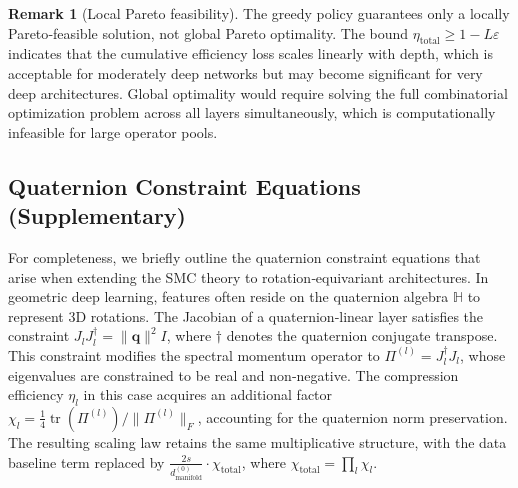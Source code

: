 \documentclass[11pt, a4paper]{article}
\theoremstyle{definition}
\newtheorem{remark}{Remark}[section]
\begin{document}
\begin{remark}[Local Pareto feasibility]
The greedy policy guarantees only a locally Pareto‑feasible solution, not global Pareto optimality. The bound $\eta_{\text{total}} \ge 1 - L\varepsilon$ indicates that the cumulative efficiency loss scales linearly with depth, which is acceptable for moderately deep networks but may become significant for very deep architectures. Global optimality would require solving the full combinatorial optimization problem across all layers simultaneously, which is computationally infeasible for large operator pools.
\end{remark}

\subsection{Quaternion Constraint Equations (Supplementary)}
\label{app:quaternion-constraints}
For completeness, we briefly outline the quaternion constraint equations that arise when extending the SMC theory to rotation‑equivariant architectures. In geometric deep learning, features often reside on the quaternion algebra $\mathbb{H}$ to represent 3D rotations. The Jacobian of a quaternion‑linear layer satisfies the constraint $J_l J_l^\dagger = \|\mathbf{q}\|^2 I$, where $\dagger$ denotes the quaternion conjugate transpose. This constraint modifies the spectral momentum operator to $\Pi^{(l)} = J_l^\dagger J_l$, whose eigenvalues are constrained to be real and non‑negative. The compression efficiency $\eta_l$ in this case acquires an additional factor $\chi_l = \frac{1}{4}\operatorname{tr}(\Pi^{(l)}) / \|\Pi^{(l)}\|_F$, accounting for the quaternion norm preservation. The resulting scaling law retains the same multiplicative structure, with the data baseline term replaced by $\frac{2s}{d_{\text{manifold}}^{(0)}} \cdot \chi_{\text{total}}$, where $\chi_{\text{total}} = \prod_l \chi_l$.
\end{document}
